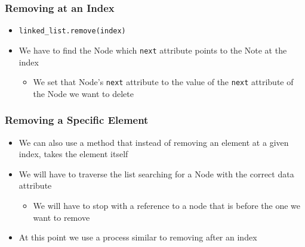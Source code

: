 \documentclass[11pt]{beamer}
\begin{document}
	\begin{frame}
		\frametitle{Removing at an Index}
		\begin{itemize}
			\item \lstinline|linked_list.remove(index)|
			\item We have to find the Node which \texttt{next} attribute points to the Note at the index
			\begin{itemize}
				\item We set that Node's \texttt{next} attribute to the value of the \texttt{next} attribute of the Node we want to delete
			\end{itemize}
		\end{itemize}
		\vspace{0.7cm}
		\begin{center}
		\end{center}
	\end{frame}


	\begin{frame}[fragile]
	\frametitle{Removing a Specific Element}
		\begin{itemize}
			\item We can also use a method that instead of removing an element at a given index, takes the element itself
            \item We will have to traverse the list searching for a Node with the correct data attribute
            \begin{itemize}
                \item We will have to stop with a reference to a node that is before the one we want to remove
            \end{itemize}
            \item At this point we use a process similar to removing after an index
		\end{itemize}
\end{frame}
\end{document}
